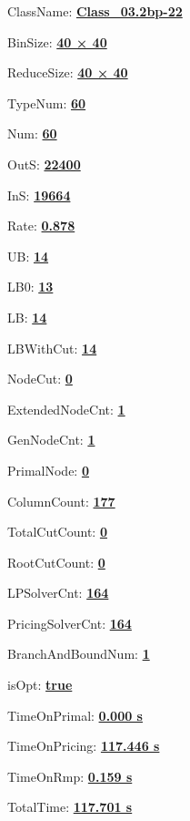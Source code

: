 \documentclass[11pt]{article}
\begin{document}
\pagestyle{empty}


ClassName: \underline{\textbf{Class_03.2bp-22}}
\par
BinSize: \underline{\textbf{40 × 40}}
\par
ReduceSize: \underline{\textbf{40 × 40}}
\par
TypeNum: \underline{\textbf{60}}
\par
Num: \underline{\textbf{60}}
\par
OutS: \underline{\textbf{22400}}
\par
InS: \underline{\textbf{19664}}
\par
Rate: \underline{\textbf{0.878}}
\par
UB: \underline{\textbf{14}}
\par
LB0: \underline{\textbf{13}}
\par
LB: \underline{\textbf{14}}
\par
LBWithCut: \underline{\textbf{14}}
\par
NodeCut: \underline{\textbf{0}}
\par
ExtendedNodeCnt: \underline{\textbf{1}}
\par
GenNodeCnt: \underline{\textbf{1}}
\par
PrimalNode: \underline{\textbf{0}}
\par
ColumnCount: \underline{\textbf{177}}
\par
TotalCutCount: \underline{\textbf{0}}
\par
RootCutCount: \underline{\textbf{0}}
\par
LPSolverCnt: \underline{\textbf{164}}
\par
PricingSolverCnt: \underline{\textbf{164}}
\par
BranchAndBoundNum: \underline{\textbf{1}}
\par
isOpt: \underline{\textbf{true}}
\par
TimeOnPrimal: \underline{\textbf{0.000 s}}
\par
TimeOnPricing: \underline{\textbf{117.446 s}}
\par
TimeOnRmp: \underline{\textbf{0.159 s}}
\par
TotalTime: \underline{\textbf{117.701 s}}
\par
\newpage


\end{document}
